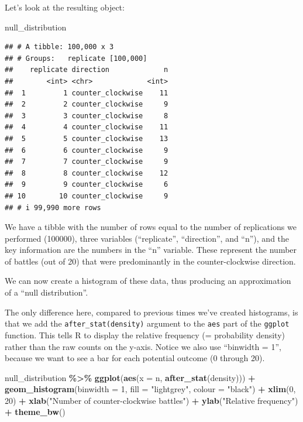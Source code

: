 \documentclass[
]{book}
\newenvironment{Shaded}{\begin{snugshade}}{\end{snugshade}}
\newcommand{\AttributeTok}[1]{\textcolor[rgb]{0.13,0.29,0.53}{#1}}
\newcommand{\DecValTok}[1]{\textcolor[rgb]{0.00,0.00,0.81}{#1}}
\newcommand{\FunctionTok}[1]{\textcolor[rgb]{0.13,0.29,0.53}{\textbf{#1}}}
\newcommand{\NormalTok}[1]{#1}
\newcommand{\SpecialCharTok}[1]{\textcolor[rgb]{0.81,0.36,0.00}{\textbf{#1}}}
\newcommand{\StringTok}[1]{\textcolor[rgb]{0.31,0.60,0.02}{#1}}
\begin{document}
Let's look at the resulting object:

\begin{Shaded}
\begin{Highlighting}[]
\NormalTok{null\_distribution}
\end{Highlighting}
\end{Shaded}

\begin{verbatim}
## # A tibble: 100,000 x 3
## # Groups:   replicate [100,000]
##    replicate direction             n
##        <int> <chr>             <int>
##  1         1 counter_clockwise    11
##  2         2 counter_clockwise     9
##  3         3 counter_clockwise     8
##  4         4 counter_clockwise    11
##  5         5 counter_clockwise    13
##  6         6 counter_clockwise     9
##  7         7 counter_clockwise     9
##  8         8 counter_clockwise    12
##  9         9 counter_clockwise     6
## 10        10 counter_clockwise     9
## # i 99,990 more rows
\end{verbatim}

We have a tibble with the number of rows equal to the number of replications we performed (100000), three variables (``replicate'', ``direction'', and ``n''), and the key information are the numbers in the ``n'' variable. These represent the number of battles (out of 20) that were predominantly in the counter-clockwise direction.

We can now create a histogram of these data, thus producing an approximation of a ``null distribution''.

The only difference here, compared to previous times we've created histograms, is that we add the \texttt{after\_stat(density)} argument to the \texttt{aes} part of the \texttt{ggplot} function. This tells R to display the relative frequency (= probability density) rather than the raw counts on the y-axis. Notice we also use ``binwidth = 1'', because we want to see a bar for each potential outcome (0 through 20).

\begin{Shaded}
\begin{Highlighting}[]
\NormalTok{null\_distribution }\SpecialCharTok{\%\textgreater{}\%}
  \FunctionTok{ggplot}\NormalTok{(}\FunctionTok{aes}\NormalTok{(}\AttributeTok{x =}\NormalTok{ n, }\FunctionTok{after\_stat}\NormalTok{(density))) }\SpecialCharTok{+}
  \FunctionTok{geom\_histogram}\NormalTok{(}\AttributeTok{binwidth =} \DecValTok{1}\NormalTok{, }\AttributeTok{fill =} \StringTok{"lightgrey"}\NormalTok{, }\AttributeTok{colour =} \StringTok{"black"}\NormalTok{) }\SpecialCharTok{+}
  \FunctionTok{xlim}\NormalTok{(}\DecValTok{0}\NormalTok{, }\DecValTok{20}\NormalTok{) }\SpecialCharTok{+}
  \FunctionTok{xlab}\NormalTok{(}\StringTok{"Number of counter{-}clockwise battles"}\NormalTok{) }\SpecialCharTok{+}
  \FunctionTok{ylab}\NormalTok{(}\StringTok{"Relative frequency"}\NormalTok{) }\SpecialCharTok{+}
  \FunctionTok{theme\_bw}\NormalTok{()}
\end{Highlighting}
\end{Shaded}
\end{document}
